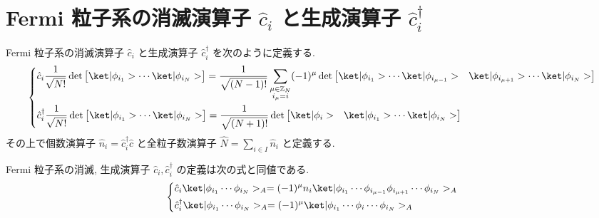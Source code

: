 \documentclass[uplatex,dvipdfmx,a4paper,11pt]{jlreq}
\DeclareMathOperator{\Det}{det}
\newcommand{\ZZ}{\mathbb{Z}}
\numberwithin{equation}{section}
\theoremstyle{definition}
\begin{document}
\section{Fermi 粒子系の消滅演算子 $\hat{c}_i$ と生成演算子 $\hat{c}_i^\dagger$}
\begin{definition}
  Fermi 粒子系の消滅演算子 $\hat{c}_i$ と生成演算子 $\hat{c}_i^\dagger$ を次のように定義する.
  \begin{align}
    \begin{dcases}
      \hat{c}_i\frac{1}{\sqrt{N!}}\Det\begin{bmatrix}\ket|\phi_{i_1}> \cdots \ket|\phi_{i_N}>\end{bmatrix} = \frac{1}{\sqrt{(N-1)!}}\sum_{\substack{\mu\in\ZZ_N \\ i_\mu = i}}(-1)^\mu\Det\begin{bmatrix}\ket|\phi_{i_1}> \cdots \ket|\phi_{i_{\mu-1}}> & \ket|\phi_{i_{\mu+1}}>\cdots\ket|\phi_{i_N}>\end{bmatrix} \\
      \hat{c}_i^\dagger\frac{1}{\sqrt{N!}}\Det\begin{bmatrix}\ket|\phi_{i_1}> \cdots \ket|\phi_{i_N}>\end{bmatrix} = \frac{1}{\sqrt{(N+1)!}}\Det\begin{bmatrix}\ket|\phi_i> & \ket|\phi_{i_1}> \cdots \ket|\phi_{i_N}>\end{bmatrix}
    \end{dcases}
  \end{align}
  その上で個数演算子 $\hat{n}_i = \hat{c}_i^\dagger\hat{c}$ と全粒子数演算子 $\hat{N} = \sum_{i\in I}\hat{n}_i$ と定義する.
\end{definition}
\begin{theorem}[Q21-50]
  Fermi 粒子系の消滅, 生成演算子 $\hat{c}_i, \hat{c}_i^\dagger$ の定義は次の式と同値である.
  \begin{align}
    \begin{dcases}
      \hat{c}_i\ket|\phi_{i_1}\cdots\phi_{i_N}>_A = (-1)^\mu n_i\ket|\phi_{i_1}\cdots\phi_{i_{\mu-1}}\phi_{i_{\mu+1}}\cdots\phi_{i_N}>_A \\
      \hat{c}_i^\dagger\ket|\phi_{i_1}\cdots\phi_{i_N}>_A = (-1)^\mu\ket|\phi_{i_1}\cdots\phi_i\cdots\phi_{i_N}>_A
    \end{dcases}
  \end{align}
\end{theorem}
\end{document}

